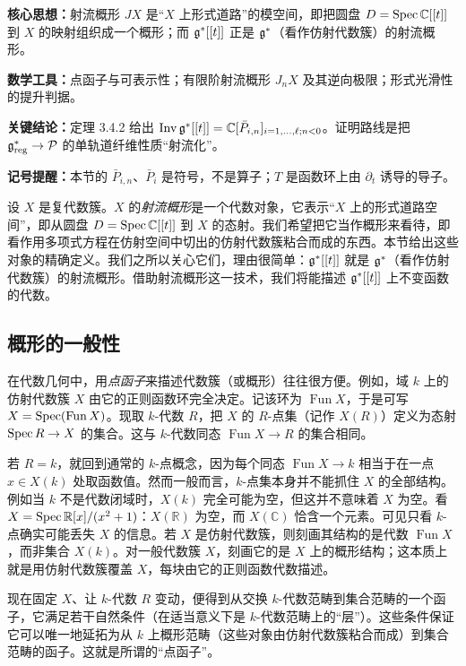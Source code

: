 \begin{keypoints}
    \item \textbf{核心思想：}射流概形 $JX$ 是“$X$ 上形式道路”的模空间，即把圆盘 $D=\operatorname{Spec}\mathbb{C}[[t]]$ 到 $X$ 的映射组织成一个概形；而 $\mathfrak{g}^*[[t]]$ 正是 $\mathfrak{g}^*$（看作仿射代数簇）的射流概形。
    \item \textbf{数学工具：}点函子与可表示性；有限阶射流概形 $J_nX$ 及其逆向极限；形式光滑性的提升判据。
    \item \textbf{关键结论：}定理 3.4.2 给出 $\operatorname{Inv}\mathfrak{g}^*[[t]]=\mathbb{C}[\bar P_{i,n}]_{i=1,\dots,\ell;n<0}$。证明路线是把 $\mathfrak{g}^*_{\mathrm{reg}}\to\mathcal{P}$ 的单轨道纤维性质“射流化”。
    \item \textbf{记号提醒：}本节的 $\bar P_{i,n}$、$\bar P_i$ 是符号，不是算子；$T$ 是函数环上由 $\partial_t$ 诱导的导子。
\end{keypoints}

设 $X$ 是复代数簇。$X$ 的\emph{射流概形}是一个代数对象，它表示“$X$ 上的形式道路空间”，即从圆盘 $D=\operatorname{Spec}\mathbb{C}[[t]]$ 到 $X$ 的态射。我们希望把它当作概形来看待，即看作用多项式方程在仿射空间中切出的仿射代数簇粘合而成的东西。本节给出这些对象的精确定义。我们之所以关心它们，理由很简单：$\mathfrak{g}^*[[t]]$ 就是 $\mathfrak{g}^*$（看作仿射代数簇）的射流概形。借助射流概形这一技术，我们将能描述 $\mathfrak{g}^*[[t]]$ 上不变函数的代数。

\subsection{概形的一般性}

在代数几何中，用\emph{点函子}来描述代数簇（或概形）往往很方便。例如，域 $k$ 上的仿射代数簇 $X$ 由它的正则函数环完全决定。记该环为 $\operatorname{Fun}X$，于是可写 $X=\operatorname{Spec}(\operatorname{Fun}X)$。现取 $k$-代数 $R$，把 $X$ 的 $R$-点集（记作 $X(R)$）定义为态射 $\operatorname{Spec} R\to X$ 的集合。这与 $k$-代数同态 $\operatorname{Fun}X\to R$ 的集合相同。

若 $R=k$，就回到通常的 $k$-点概念，因为每个同态 $\operatorname{Fun}X\to k$ 相当于在一点 $x\in X(k)$ 处取函数值。然而一般而言，$k$-点集本身并不能抓住 $X$ 的全部结构。例如当 $k$ 不是代数闭域时，$X(k)$ 完全可能为空，但这并不意味着 $X$ 为空。看 $X=\operatorname{Spec}\mathbb{R}[x]/(x^2+1)$：$X(\mathbb{R})$ 为空，而 $X(\mathbb{C})$ 恰含一个元素。可见只看 $k$-点确实可能丢失 $X$ 的信息。若 $X$ 是仿射代数簇，则刻画其结构的是代数 $\operatorname{Fun}X$，而非集合 $X(k)$。对一般代数簇 $X$，刻画它的是 $X$ 上的概形结构；这本质上就是用仿射代数簇覆盖 $X$，每块由它的正则函数代数描述。

现在固定 $X$、让 $k$-代数 $R$ 变动，便得到从交换 $k$-代数范畴到集合范畴的一个函子，它满足若干自然条件（在适当意义下是 $k$-代数范畴上的“层”）。这些条件保证它可以唯一地延拓为从 $k$ 上概形范畴（这些对象由仿射代数簇粘合而成）到集合范畴的函子。这就是所谓的“点函子”。

